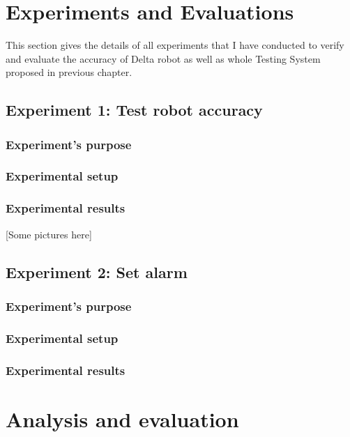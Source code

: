\section{Experiments and Evaluations}
This section gives the details of all experiments that I have conducted to verify and evaluate the accuracy of Delta robot as well as whole Testing System proposed in previous chapter. 

\subsection{Experiment 1: Test robot accuracy}
\subsubsection{Experiment's purpose}

\subsubsection{Experimental setup}

\subsubsection{Experimental results}
[Some pictures here]

\subsection{Experiment 2: Set alarm}
\subsubsection{Experiment's purpose}

\subsubsection{Experimental setup}

\subsubsection{Experimental results}

\section{Analysis and evaluation}
